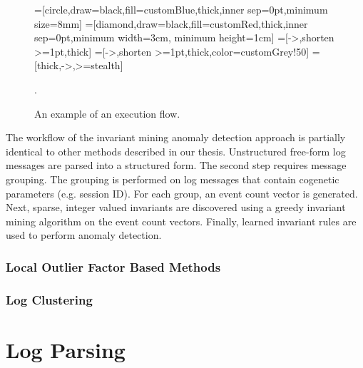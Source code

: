\begin{figure}\centering
	=[circle,draw=black,fill=customBlue,thick,inner sep=0pt,minimum size=8mm]
		=[diamond,draw=black,fill=customRed,thick,inner sep=0pt,minimum width=3cm, minimum height=1cm]
		=[->,shorten >=1pt,thick]
		=[->,shorten >=1pt,thick,color=customGrey!50]
		 = [thick,->,>=stealth]

	\caption{An example of an execution flow.}.
	\label{figure:invariantMiningExecutionFlow}
\end{figure}

The workflow of the invariant mining anomaly detection approach is partially identical to other methods described in our thesis. Unstructured free-form log messages are parsed into a structured form. The second step requires message grouping. The grouping is performed on log messages that contain cogenetic parameters (e.g. session ID). For each group, an event count vector is generated. Next, sparse, integer valued invariants are discovered using a greedy invariant mining algorithm on the event count vectors. Finally, learned invariant rules are used to perform anomaly detection.
\newpage

 \subsubsection{Local Outlier Factor Based Methods}
 
 \subsubsection{Log Clustering}
 
\section{Log Parsing}

